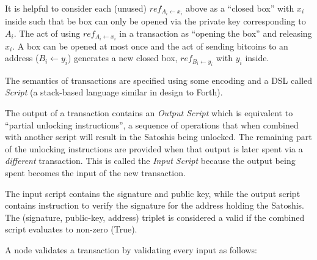 \documentclass[]{report}   %
\newcommand{\sr}{\stackrel}
\newcommand{\ra}{\rightarrow}
\newcommand{\la}{\leftarrow}
\newcommand{\lea}{\leftarrow}
\begin{document}
It is helpful to consider each (unused) $ref_{A_i \lea x_i}$
above as a ``closed box'' with $x_i$ inside such that be box can only be opened via the private key corresponding to $A_i$. The act of using $ref_{A_i \lea x_i}$ in a transaction as ``opening the box'' and releasing $x_i$. A box can be opened at most once and the act of sending bitcoins to an address ($B_i\la y_i$) generates a new closed box, $ref_{B_i\lea y_i}$ with $y_i$ inside. 

The semantics of transactions are specified using some encoding and a DSL called {\em Script} (a stack-based language similar in design to Forth). 

The output of a transaction contains an {\em Output Script} which is equivalent to ``partial unlocking instructions'', a sequence of operations that when combined with another script will result in the Satoshis being unlocked. The remaining part of the unlocking instructions are provided when that output is later spent via a {\em different} 
transaction. This is called the {\em Input Script} because the output being spent becomes the input of the new transaction. 

The input script contains the signature and public key, while the output script contains instruction to verify the signature for the address holding the Satoshis. The (signature, public-key, address) triplet is considered a valid if the combined script evaluates to non-zero (True).

%

A node validates a transaction by validating every input as follows:

\end{document}
